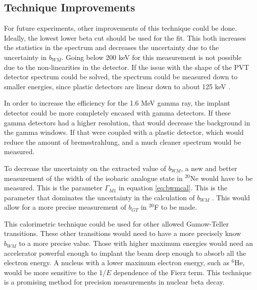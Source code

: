 \documentclass[../MaxHughesThesis.tex]{subfiles}
\begin{document}
\subsection{Technique Improvements}
For future experiments, other improvements of this technique could be done.
Ideally, the lowest lower beta cut should be used for the fit.
This both increases the statistics in the spectrum and decreases the uncertainty due to the uncertainty in $b_{WM}$.
Going below $200$ keV for this measurement is not possible due to the non-linearities in the detector.
If the issue with the shape of the PVT detector spectrum could be solved, the spectrum could be measured down to smaller energies, since plastic detectors are linear down to about 125 keV \cite{Kno10}. 

In order to increase the efficiency for the 1.6 MeV gamma ray, the implant detector could be more completely encased with gamma detectors.
If these gamma detectors had a higher resolution, that would decrease the background in the gamma windows. 
If that were coupled with a plastic detector, which would reduce the amount of bremsstrahlung, and a much cleaner spectrum would be measured.

To decrease the uncertainty on the extracted value of $b_{WM}$, a new and better measurement of the width of the isobaric analogue state in $^{20}$Ne would have to be measured.
This is the parameter $\Gamma_{M1}$ in equation \ref{eq:bwmcal}.
This is the parameter that dominates the uncertainty in  the calculation of $b_{WM}$ \cite{Min11}.
This would allow for a more precise measurement of $b_{GT}$ in $^{20}$F to be made.

This calorimetric technique could be used for other allowed Gamow-Teller transitions.
These other transitions would need to have a more precisely know $b_{WM}$ to a more precise value.
Those with higher maximum energies would need an accelerator powerful enough to implant the beam deep enough to absorb all the electron energy.
A nucleus with a lower maximum electron energy, such as $^{6}$He, would be more sensitive to the 1/$E$ dependence of the Fierz term. 
This technique is a promising method for precision measurements in nuclear beta decay.
\end{document}

